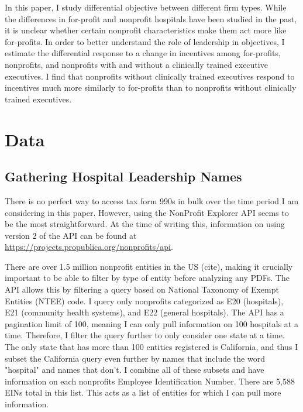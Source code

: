 \documentclass[12pt]{article}
\begin{document}
    In this paper, I study differential objective between different firm types. While the differences in for-profit and nonprofit hospitals have been studied in the past, it is unclear whether certain nonprofit characteristics make them act more like for-profits. In order to better understand the role of leadership in objectives, I estimate the differential response to a change in incentives among for-profits, nonprofits, and nonprofits with and without a clinically trained executive executives. I find that nonprofits without clinically trained executives respond to incentives much more similarly to for-profits than to nonprofits without clinically trained executives.

	
	\newpage

    \printbibliography

\appendix

 \section{Data}\label{appendixdata}

\subsection{Gathering Hospital Leadership Names}

There is no perfect way to access tax form 990s in bulk over the time period I am considering in this paper. However, using the NonProfit Explorer API seems to be the most straightforward. At the time of writing this, information on using version 2 of the API can be found at \hyperlink{https://projects.propublica.org/nonprofits/api}{https://projects.propublica.org/nonprofits/api}. 
    
There are over 1.5 million nonprofit entities in the US (cite), making it crucially important to be able to filter by type of entity before analyzing any PDFs. The API allows this by filtering a query based on National Taxonomy of Exempt Entities (NTEE) code. I query only nonprofits categorized as E20 (hospitals), E21 (community health systems), and E22 (general hospitals). The API has a pagination limit of 100, meaning I can only pull information on 100 hospitals at a time. Therefore, I filter the query further to only consider one state at a time. The only state that has more than 100 entities registered is California, and thus I subset the California query even further by names that include the word "hospital" and names that don't. I combine all of these subsets and have information on each nonprofits Employee Identification Number. There are 5,588 EINs total in this list. This acts as a list of entities for which I can pull more information. 
\end{document}
